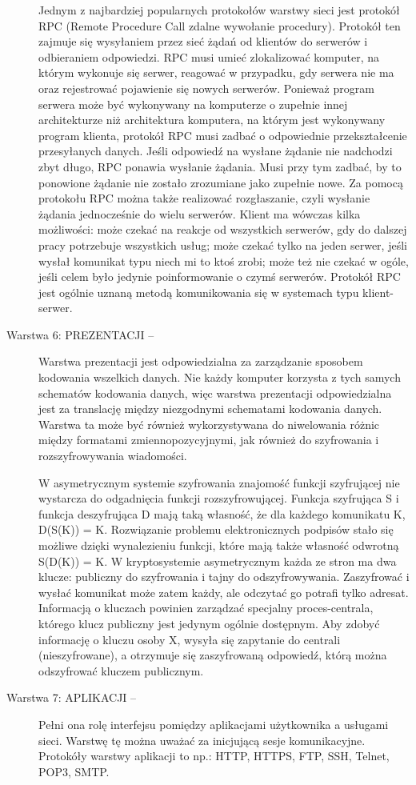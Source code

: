 \documentclass[a4paper, 10pt]{article}
\begin{document}
\begin{description}
{    Jednym z najbardziej popularnych protokołów warstwy sieci jest protokół RPC (Remote Procedure Call  zdalne wywołanie procedury). Protokół ten zajmuje się wysyłaniem przez sieć żądań od klientów do serwerów i odbieraniem odpowiedzi. RPC musi umieć zlokalizować komputer, na którym wykonuje się serwer, reagować w przypadku, gdy serwera nie ma oraz rejestrować pojawienie się nowych serwerów. Ponieważ program serwera może być wykonywany na komputerze o zupełnie innej architekturze niż architektura komputera, na którym jest wykonywany program klienta, protokół RPC musi zadbać o odpowiednie przekształcenie przesyłanych danych.  Jeśli odpowiedź na wysłane żądanie nie nadchodzi zbyt długo, RPC ponawia wysłanie żądania. Musi przy tym zadbać, by to ponowione żądanie nie zostało zrozumiane jako zupełnie nowe. Za pomocą protokołu RPC można także realizować rozgłaszanie, czyli wysłanie żądania jednocześnie do wielu serwerów. Klient ma wówczas kilka możliwości: może czekać na reakcje od wszystkich serwerów, gdy do dalszej pracy potrzebuje wszystkich usług; może czekać tylko na jeden serwer, jeśli wysłał komunikat typu niech mi to ktoś zrobi; może też nie czekać w ogóle, jeśli celem było jedynie poinformowanie o czymś serwerów. Protokół RPC jest ogólnie uznaną metodą komunikowania się w systemach typu klient-serwer.} 
    
     \item[Warstwa 6: PREZENTACJI --  ]{Warstwa prezentacji jest odpowiedzialna za zarządzanie sposobem kodowania wszelkich danych. Nie każdy komputer korzysta z tych samych schematów kodowania danych, więc warstwa prezentacji odpowiedzialna jest za translację między niezgodnymi schematami kodowania danych. Warstwa ta może być również wykorzystywana do niwelowania różnic między formatami zmiennopozycyjnymi, jak również do szyfrowania i rozszyfrowywania wiadomości. 
     
      W asymetrycznym systemie szyfrowania znajomość funkcji szyfrującej nie wystarcza do odgadnięcia funkcji rozszyfrowującej. Funkcja szyfrująca S i funkcja deszyfrująca D mają taką własność, że dla każdego komunikatu K, D(S(K)) = K. Rozwiązanie problemu elektronicznych podpisów stało się możliwe dzięki wynalezieniu funkcji, które mają także własność odwrotną S(D(K)) = K. W kryptosystemie asymetrycznym każda ze stron ma dwa klucze: publiczny do szyfrowania i tajny do odszyfrowywania. Zaszyfrować i wysłać komunikat może zatem każdy, ale odczytać go potrafi tylko adresat. Informacją o kluczach powinien zarządzać specjalny proces-centrala, którego klucz publiczny jest jedynym ogólnie dostępnym. Aby zdobyć informację o kluczu osoby X, wysyła się zapytanie do centrali (nieszyfrowane), a otrzymuje się zaszyfrowaną odpowiedź, którą można odszyfrować kluczem publicznym.}
     
     \item[Warstwa 7: APLIKACJI -- ]{Pełni ona rolę interfejsu pomiędzy aplikacjami użytkownika a usługami sieci. Warstwę tę można uważać za inicjującą sesje komunikacyjne. Protokóły warstwy aplikacji to np.: HTTP, HTTPS, FTP, SSH, Telnet, POP3, SMTP.} 
\end{description}
\end{document}
